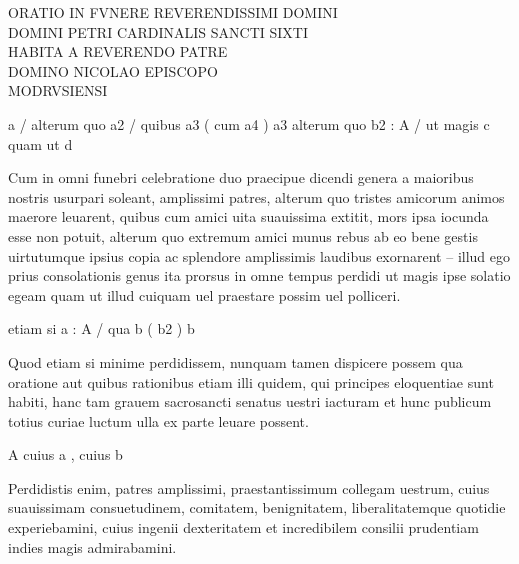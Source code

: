 \documentclass[a5paper,twoside]{article}
\begin{document}
\frenchspacing

\fontsize{11}{13.2}
\selectfont

\linespread{1.1}

\thispagestyle{empty}


\beginnumbering
\autopar


\pstart

{\centering

\noindent ORATIO IN FVNERE REVERENDISSIMI DOMINI \\
DOMINI PETRI CARDINALIS SANCTI SIXTI \\
HABITA A REVERENDO PATRE \\
DOMINO NICOLAO 
EPISCOPO \\
MODRVSIENSI

}

\pend


\bigskip

a / alterum quo a2 / quibus a3 ( cum a4 ) a3 alterum quo b2 : A / ut magis c quam ut d

Cum in omni funebri celebratione 
duo praecipue dicendi genera 
	a maioribus nostris 
	usurpari soleant, 
	amplissimi patres, 
	alterum quo tristes amicorum animos maerore leuarent, 
		quibus 
			cum amici uita suauissima extitit, 
			mors ipsa iocunda esse non potuit, 
	alterum quo extremum amici munus 
		rebus ab eo bene gestis 
		uirtutumque ipsius copia ac splendore 
			amplissimis laudibus exornarent – 
illud ego prius consolationis genus ita prorsus in omne tempus perdidi 
	ut magis ipse solatio egeam 
	quam ut illud cuiquam 
		uel praestare possim 
		uel polliceri. 

etiam si a : A / qua b ( b2 ) b

Quod etiam si minime perdidissem, 
	nunquam tamen dispicere possem 
		qua oratione 
		aut quibus rationibus 
			etiam illi quidem, 
				qui principes eloquentiae sunt habiti, 
			hanc tam grauem sacrosancti senatus uestri iacturam 
			et hunc publicum totius curiae luctum 
				ulla ex parte 
					leuare possent. 

A cuius a , cuius b

Perdidistis enim, patres amplissimi, praestantissimum collegam uestrum, 
	cuius suauissimam consuetudinem, 
		comitatem, 
		benignitatem, 
		liberalitatemque 
			quotidie experiebamini, 
	cuius ingenii dexteritatem 
		et incredibilem consilii prudentiam 
			indies magis admirabamini. 
\end{document}
